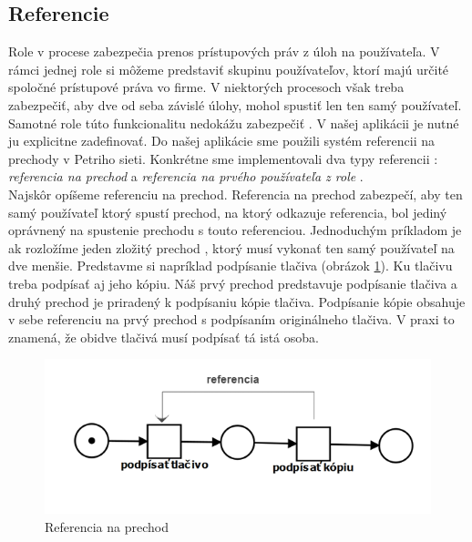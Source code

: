 \subsection{Referencie}
Role v procese zabezpečia prenos prístupových práv z úloh na používateľa. V rámci jednej role si môžeme predstaviť skupinu používateľov, ktorí majú určité spoločné prístupové práva vo firme. V niektorých procesoch však treba zabezpečiť, aby dve od seba závislé úlohy, mohol spustiť len ten samý používateľ. Samotné role túto funkcionalitu nedokážu zabezpečiť . V našej aplikácii je nutné ju explicitne zadefinovať. Do našej aplikácie sme použili systém referencii na prechody v Petriho sieti. Konkrétne sme implementovali dva typy referencii : \emph{referencia na prechod} a \emph{referencia na prvého používateľa z role} .\\ 

Najskôr opíšeme referenciu na prechod. Referencia na prechod zabezpečí, aby ten samý používateľ ktorý spustí prechod, na ktorý odkazuje referencia, bol jediný oprávnený na spustenie prechodu s touto referenciou. Jednoduchým príkladom je ak rozložíme jeden zložitý prechod , ktorý musí vykonať ten samý používateľ na dve menšie. Predstavme si napríklad podpísanie tlačiva (obrázok \ref{fig:referencia_na_prechod}). Ku tlačivu treba podpísať aj jeho kópiu. Náš prvý prechod predstavuje podpísanie tlačiva a druhý prechod je priradený k podpísaniu kópie tlačiva. Podpísanie kópie obsahuje v sebe referenciu na prvý prechod s podpísaním originálneho tlačiva. V praxi to znamená, že obidve tlačivá musí podpísať tá istá osoba. \\

	\begin{figure}[h]
		\centering
		\includegraphics[width=0.7\linewidth]{images/referencia}
		\caption{Referencia na prechod}
		\label{fig:referencia_na_prechod}
	\end{figure}


